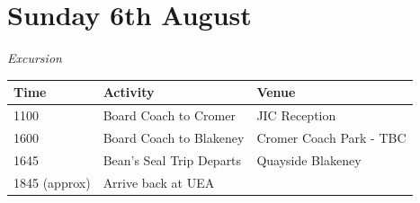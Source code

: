 \documentclass[12pt,]{book}
\theoremstyle{definition}
\theoremstyle{definition}
\theoremstyle{remark}
\begin{document}
\section*{Sunday 6th August}\label{sunday-6th-august}

\emph{Excursion}

\begin{longtable}[]{@{}lll@{}}
\toprule
\begin{minipage}[b]{0.18\columnwidth}\raggedright\strut
Time\strut
\end{minipage} & \begin{minipage}[b]{0.32\columnwidth}\raggedright\strut
Activity\strut
\end{minipage} & \begin{minipage}[b]{0.32\columnwidth}\raggedright\strut
Venue\strut
\end{minipage}\tabularnewline
\midrule
\endhead
\begin{minipage}[t]{0.18\columnwidth}\raggedright\strut
1100\strut
\end{minipage} & \begin{minipage}[t]{0.32\columnwidth}\raggedright\strut
Board Coach to Cromer\strut
\end{minipage} & \begin{minipage}[t]{0.32\columnwidth}\raggedright\strut
JIC Reception\strut
\end{minipage}\tabularnewline
\begin{minipage}[t]{0.18\columnwidth}\raggedright\strut
1600\strut
\end{minipage} & \begin{minipage}[t]{0.32\columnwidth}\raggedright\strut
Board Coach to Blakeney\strut
\end{minipage} & \begin{minipage}[t]{0.32\columnwidth}\raggedright\strut
Cromer Coach Park - TBC\strut
\end{minipage}\tabularnewline
\begin{minipage}[t]{0.18\columnwidth}\raggedright\strut
1645\strut
\end{minipage} & \begin{minipage}[t]{0.32\columnwidth}\raggedright\strut
Bean's Seal Trip Departs\strut
\end{minipage} & \begin{minipage}[t]{0.32\columnwidth}\raggedright\strut
Quayside Blakeney\strut
\end{minipage}\tabularnewline
\begin{minipage}[t]{0.18\columnwidth}\raggedright\strut
1845 (approx)\strut
\end{minipage} & \begin{minipage}[t]{0.32\columnwidth}\raggedright\strut
Arrive back at UEA\strut
\end{minipage} & \begin{minipage}[t]{0.32\columnwidth}\raggedright\strut
\strut
\end{minipage}\tabularnewline
\bottomrule
\end{longtable}
\end{document}
